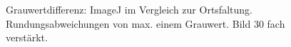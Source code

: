 \documentclass[a4paper,12pt]{article}
\begin{document}
\begin{figure}[htbp]
\caption{Grauwertdifferenz: ImageJ im Vergleich zur Ortsfaltung.
Rundungsabweichungen von max. einem Grauwert. Bild 30 fach verstärkt.}%
\label{figure_border_imageJ}
\end{figure}
\end{document}
